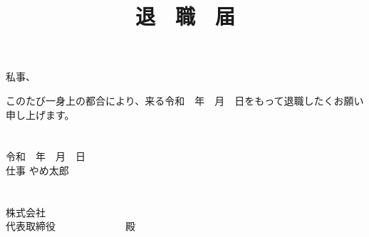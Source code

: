 \documentclass[a4j,12pt]{tarticle}
\title{\vspace{-1cm}\Huge{退　職　届}}
\author{}
\date{}
\begin{document}
\maketitle
\thispagestyle{empty}
\vspace{-2cm}
\Large{}

\section*{}
\begin{flushright}
  私事、
\end{flushright}
\vspace{-4mm}
このたび一身上の都合により、来る令和　年　月　日をもって退職したくお願い申し上げます。

\section*{}
\begin{flushright}
令和　年　月　日\\
仕事 やめ太郎
\end{flushright}

\section*{}
株式会社\\
代表取締役　　　　　　　殿
\end{document}
